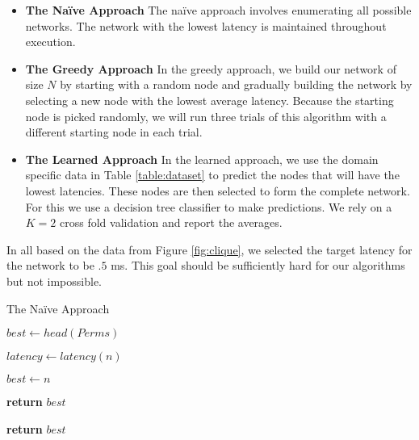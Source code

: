\begin{itemize}
\item \textbf{The Na\"{i}ve Approach} The na\"{i}ve approach involves enumerating all possible networks. The network with the lowest latency is maintained throughout execution.
\item \textbf{The Greedy Approach} In the greedy approach, we build our network of size $N$ by starting with a random node and gradually building the network by selecting a new node with the lowest average latency. Because the starting node is picked randomly, we will run three trials of this algorithm with a different starting node in each trial. 
\item \textbf{The Learned Approach} In the learned approach, we use the domain specific data in Table \ref{table:dataset} to predict the nodes that will have the lowest latencies. These nodes are then selected to form the complete network. For this we use a decision tree classifier to make predictions. We rely on a $K=2$ cross fold validation and report the averages. 
\end{itemize}

In all based on the data from Figure \ref{fig:clique}, we selected the target latency for the network to be $.5$ ms. This goal should be sufficiently hard for our algorithms but not impossible. 

\begin{algorithm}
  \caption{The Na\"{i}ve Approach}\label{algo:naive}
  \begin{algorithmic}[1]

    \State $best\gets head(Perms)$

    \State $latency\gets latency(n)$

    \State $best\gets n$
    \EndIf

    \State \textbf{return} $best$
    \EndIf
    

    \EndFor
    \State \textbf{return} $best$
    \EndProcedure
  \end{algorithmic}
\end{algorithm}

